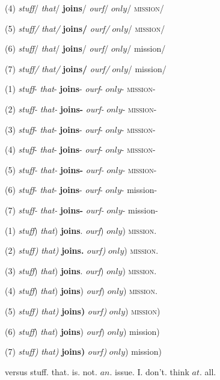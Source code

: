 \documentclass{amsart}
\begin{document}
(4) \textit{stuff}/ \emph{that}/ \textbf{joins}/ \textit{ourf}/ $only$/ \textsc{mission}/

(5) \textit{stuff/} \emph{that/} \textbf{joins/} \textit{ourf/} $only$/ \textsc{mission/}

(6) {\it stuff}/ {\em that}/ {\bf joins}/ {\it ourf}/ $only$/ {\sc mission}/

(7) {\it stuff/} {\em that/} {\bf joins/} {\it ourf/} $only$/ {\sc mission/}

\vspace{12pt}

(1) \textit{stuff}- \emph{that}- \textbf{joins}- \textit{ourf}- $only$- \textsc{mission}-

(2) \textit{stuff-} \emph{that-} \textbf{joins-} \textit{ourf-} $only$- \textsc{mission-}

(3) \textit{stuff}\/- \emph{that}\/- \textbf{joins}\/- \textit{ourf}\/- $only$- \textsc{mission}\/-

(4) \textit{stuff}- \emph{that}- \textbf{joins}- \textit{ourf}- $only$- \textsc{mission}-

(5) \textit{stuff-} \emph{that-} \textbf{joins-} \textit{ourf-} $only$- \textsc{mission-}

(6) {\it stuff}- {\em that}- {\bf joins}- {\it ourf}- $only$- {\sc mission}-

(7) {\it stuff-} {\em that-} {\bf joins-} {\it ourf-} $only$- {\sc mission-}

\vspace{12pt}

(1) \textit{stuff}) \emph{that}) \textbf{joins}. \textit{ourf}) $only$) \textsc{mission}.

(2) \textit{stuff)} \emph{that)} \textbf{joins.} \textit{ourf)} $only$) \textsc{mission.}

(3) \textit{stuff}\/) \emph{that}\/) \textbf{joins}\/. \textit{ourf}\/) $only$) \textsc{mission}\/.

(4) \textit{stuff}) \emph{that}) \textbf{joins}) \textit{ourf}) $only$) \textsc{mission}.

(5) \textit{stuff)} \emph{that)} \textbf{joins)} \textit{ourf)} $only$) \textsc{mission)}

(6) {\it stuff}) {\em that}) {\bf joins}) {\it ourf}) $only$) {\sc mission})

(7) {\it stuff)} {\em that)} {\bf joins)} {\it ourf)} $only$) {\sc mission)}

\vspace{12pt}

versus stuff. that. is. not. $an$. issue. I. don't. think $at$. all.
\end{document}
